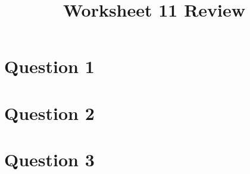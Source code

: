 \documentclass[12pt]{article}
\begin{document}
\title{Worksheet 11 Review}
\maketitle

\section*{Question 1}

\section*{Question 2}

\section*{Question 3}
\end{document}
